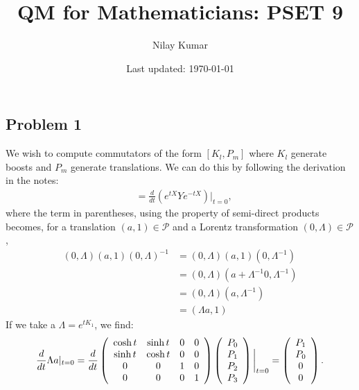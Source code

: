 \documentclass{../mathnotes}
\title{QM for Mathematicians: PSET 9}
\author{Nilay Kumar}
\date{Last updated: \today}
\begin{document}
\maketitle

\subsection*{Problem 1}

We wish to compute commutators of the form $[K_l,P_m]$ where $K_l$ generate boosts and $P_m$ generate
translations. We can do this by following the derivation in the notes:
\begin{align*}
    [X,Y]&=\frac{d}{dt}\left( e^{tX}Ye^{-tX} \right)|_{t=0},
\end{align*}
where the term in parentheses, using the property of semi-direct products becomes, for a translation $(a,1)\in\mathcal{P}$
and a Lorentz transformation $(0,\Lambda)\in\mathcal{P}$,
\begin{align*}
    (0,\Lambda)(a,1)(0,\Lambda)^{-1}&=(0,\Lambda)(a,1)(0,\Lambda^{-1})\\
    &=(0,\Lambda)(a+\Lambda^{-1}0,\Lambda^{-1})\\
    &=(0,\Lambda)(a,\Lambda^{-1})\\
    &=(\Lambda a,1)
\end{align*}
If we take a $\Lambda=e^{tK_1}$, we find:
\begin{align*}
    \frac{d}{dt}\Lambda a|_{t=0}=\frac{d}{dt}
    \left( 
    \begin{array}[]{cccc}
        \cosh t & \sinh t & 0 & 0\\ 
        \sinh t & \cosh t & 0 & 0\\ 
        0 & 0 & 1 & 0\\ 
        0 & 0 & 0 & 1 
    \end{array}
    \right)
    \left( 
    \begin{array}[]{c}
        P_0\\
        P_1\\
        P_2\\
        P_3
    \end{array}
    \right)
    \bigg|_{t=0}=
    \left( 
    \begin{array}[]{c}
        P_1\\
        P_0\\
        0\\
        0
    \end{array}
    \right).
\end{align*}
\end{document}
